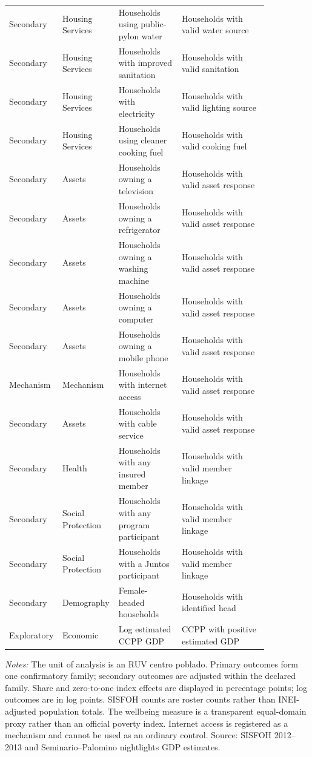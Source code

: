 \begin{longtable}{p{0.10\linewidth}p{0.18\linewidth}p{0.24\linewidth}p{0.33\linewidth}}
Secondary & Housing Services & Households using public-pylon water & Households with valid water source \\
Secondary & Housing Services & Households with improved sanitation & Households with valid sanitation \\
Secondary & Housing Services & Households with electricity & Households with valid lighting source \\
Secondary & Housing Services & Households using cleaner cooking fuel & Households with valid cooking fuel \\
Secondary & Assets & Households owning a television & Households with valid asset response \\
Secondary & Assets & Households owning a refrigerator & Households with valid asset response \\
Secondary & Assets & Households owning a washing machine & Households with valid asset response \\
Secondary & Assets & Households owning a computer & Households with valid asset response \\
Secondary & Assets & Households owning a mobile phone & Households with valid asset response \\
Mechanism & Mechanism & Households with internet access & Households with valid asset response \\
Secondary & Assets & Households with cable service & Households with valid asset response \\
Secondary & Health & Households with any insured member & Households with valid member linkage \\
Secondary & Social Protection & Households with any program participant & Households with valid member linkage \\
Secondary & Social Protection & Households with a Juntos participant & Households with valid member linkage \\
Secondary & Demography & Female-headed households & Households with identified head \\
Exploratory & Economic & Log estimated CCPP GDP & CCPP with positive estimated GDP \\
\bottomrule
\end{longtable}
\begin{minipage}{0.98\linewidth}\footnotesize\textit{Notes:} The unit of analysis is an RUV centro poblado. Primary outcomes form one confirmatory family; secondary outcomes are adjusted within the declared family. Share and zero-to-one index effects are displayed in percentage points; log outcomes are in log points. SISFOH counts are roster counts rather than INEI-adjusted population totals. The wellbeing measure is a transparent equal-domain proxy rather than an official poverty index. Internet access is registered as a mechanism and cannot be used as an ordinary control. Source: SISFOH 2012--2013 and Seminario--Palomino nightlights GDP estimates.\end{minipage}
\endgroup
